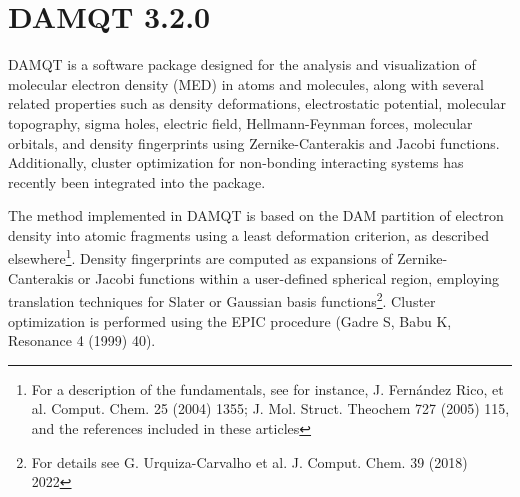 \documentclass[10pt]{article}
\begin{document}
\newcommand{\bigtoolbE}{
\begin{minipage}[t][1mm][t]{.5cm}{
\vspace*{-8pt}\texttt{[image: toolb11.png]}}
\end{minipage}
}
\newcommand{\undock}{
\begin{minipage}[t][1mm][t]{.3cm}{
\vspace*{-8pt}\texttt{[image: undock.png]}}
\end{minipage}
}
\newcommand{\zoomin}{
\begin{minipage}[t][1mm][t]{.3cm}{
\vspace*{-8pt}\texttt{[image: zoom\_in.png]}}
\end{minipage}
}
\newcommand{\zoomout}{
\begin{minipage}[t][1mm][t]{.3cm}{
\vspace*{-8pt}\texttt{[image: zoom\_out.png]}}
\end{minipage}
}

\newenvironment{rcase}{
\left.\begin{aligned}}
  {\end{aligned}\right\rbrace
}
\newenvironment{lcase}{
\left\lbrace\begin{aligned}}
  {\end{aligned}\right.
}

\maketitle
{}

\newpage

\tableofcontents


\pagebreak

\section*{DAMQT 3.2.0 \label{sec:0}}
DAMQT is a software package designed for the analysis and visualization of molecular electron density (MED) in atoms and molecules, along with several related properties such as density deformations, electrostatic potential, molecular topography, sigma holes, electric field, Hellmann-Feynman forces, molecular orbitals, and density fingerprints using Zernike-Canterakis and Jacobi functions. Additionally, cluster optimization for non-bonding interacting systems has recently been integrated into the package.

The method implemented in DAMQT is based on the DAM partition of electron density into atomic fragments using a least deformation criterion, as described elsewhere\footnote{For a description of the
fundamentals, see for instance, J. Fern\'andez Rico, et al. Comput. Chem. 25
(2004) 1355; J. Mol. Struct. Theochem 727 (2005) 115, and the references
included in these articles}. Density fingerprints are computed as expansions of Zernike-Canterakis or Jacobi functions within a user-defined spherical region, employing translation techniques for Slater or Gaussian basis functions\footnote{For details see G. Urquiza-Carvalho et al. J. Comput. Chem. 39 (2018) 2022}. Cluster optimization is performed using the EPIC procedure (Gadre S, Babu K, Resonance 4 (1999) 40).
\end{document}
